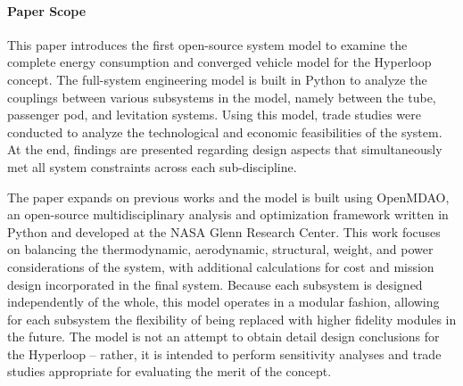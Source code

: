 \paragraph{Paper Scope}
    This paper introduces the first open-source system model to examine the
    complete energy consumption and converged vehicle model for the Hyperloop concept.
    The full-system engineering model is built in Python to analyze the couplings
    between various subsystems in the model, namely between the tube, passenger pod, and
    levitation systems. Using this model, trade studies were conducted to analyze the technological
    and economic feasibilities of the system.
    At the end, findings are presented regarding design aspects that simultaneously
    met all system constraints across each sub-discipline.

    The paper expands on previous works \cite{Chin} and the model is built
    using OpenMDAO, an open-source multidisciplinary analysis and optimization
    framework written in Python and developed at the NASA Glenn Research Center.
    This work focuses on balancing the thermodynamic, aerodynamic, structural,
    weight, and power considerations of the system, with additional calculations for cost
    and mission design incorporated in the final system. Because each subsystem
    is designed independently of the whole, this model operates in a modular fashion, allowing
    for each subsystem the flexibility of being replaced with higher fidelity modules in the future.
    The model is not an attempt to obtain detail design conclusions for the Hyperloop
    -- rather, it is intended to perform sensitivity analyses
    and trade studies appropriate for evaluating the merit of the concept.

